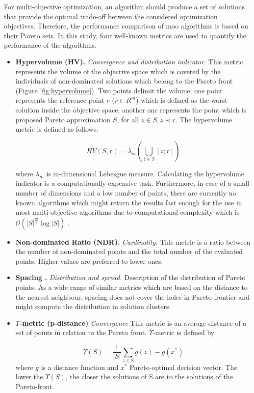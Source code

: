             For multi-objective optimization, an algorithm should produce a set of solutions that provide the optimal trade-off between the considered optimization objectives. Therefore, the performance comparison of \gls{moo} algorithms is based on their Pareto sets. In this study, four well-known metrics are used to quantify the performance of the algorithms.
            \begin{itemize}
                \item \textbf{Hypervolume (HV).}\cite{Zitzler2000ComparisonOM} \textit{Convergence and distribution indicator.}
                This metric represents the volume of the objective space which is covered by the individuals of non-dominated solutions which belong to the Pareto front (Figure \ref{fig:hypervolume}). Two points delimit the volume: one point represents the reference point $r$ ($r \in R^m$) which is defined as the worst solution inside the objective space; another one represents the point which is proposed Pareto approximation $S$, for all $z \in S, z \prec r$. The hypervolume metric is defined as follows:

                    \[HV(S,r) = \lambda_m(\bigcup\limits_{z \in S} [z;r])\]

                where $\lambda_m$ is m-dimensional Lebesgue measure.    
                Calculating the hypervolume indicator is a computationally expensive task. Furthermore, in case of a small number of dimensions and a low number of points, there are currently no known algorithms which might return the results fast enough for the use in most multi-objective algorithms due to computational complexity which is 
                $\mathcal{O}(|S|^{\frac{m}{2}}\log{|S|}) $ \cite{BeumeFLPV09}.
                \item \textbf{Non-dominated Ratio (NDR).} \textit{Cardinality.} This metric is a ratio between the number of non-dominated points and the total number of the evaluated points.  Higher values are preferred to lower ones.
                \item \textbf{Spacing \cite{Schott1995FaultTD}.} \textit{Distribution and spread.} Description of the distribution of Pareto points. As a wide range of similar metrics which are based on the distance to the nearest neighbour, spacing does not cover the holes in Pareto frontier and might compute the distribution in solution clusters.
                \item \textbf{$\Upsilon$-metric (p-distance)}\cite{Martens13} \textit{Convergence} This metric is an average distance of a set of points in relation to the Pareto front. $\Upsilon$-metric is defined by

                    \[\Upsilon(S) = \frac{1}{|S|}\sum_{z\in S}g(z)-g(x^*)\]
                where $g$ is a distance function and $x^*$ Pareto-optimal decision vector.
                The lower the $\Upsilon (S)$, the closer the solutions of S are to the solutions of the Pareto-front. 
                
            \end{itemize}

